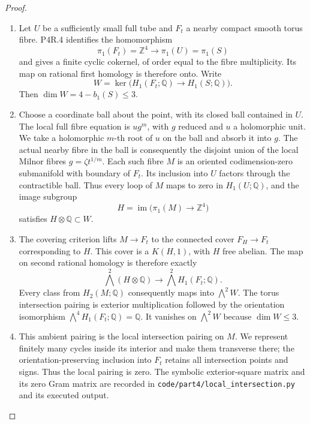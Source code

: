 \begin{proof}

\begin{enumerate}[label={$\langle1\rangle$\arabic*.},leftmargin=*]
\item Let $U$ be a sufficiently small full tube and $F_t$ a
nearby compact smooth torus fibre. P4R.4 identifies the
homomorphism
\[
 \pi_1(F_t)=\mathbb Z^4\longrightarrow
 \pi_1(U)=\pi_1(S)
\]
and gives a finite cyclic cokernel, of order equal to
the fibre multiplicity. Its map on rational first
homology is therefore onto. Write
\[
 W=\ker\bigl(H_1(F_t;\mathbb Q)\longrightarrow
                  H_1(S;\mathbb Q)\bigr).
\]
Then $\dim W=4-b_1(S)\le3$.

\item Choose a coordinate ball about the point, with its
closed ball contained in $U$. The local full fibre
equation is $u g^m$, with $g$ reduced and $u$ a
holomorphic unit. We take a holomorphic $m$-th root of
$u$ on the ball and absorb it into $g$. The actual
nearby fibre in the ball is consequently the disjoint
union of the local Milnor fibres
$g=\zeta t^{1/m}$. Each such fibre $M$ is an oriented
codimension-zero submanifold with boundary of $F_t$.
Its inclusion into $U$ factors through the contractible
ball. Thus every loop of $M$ maps to zero in
$H_1(U;\mathbb Q)$, and the image subgroup
\[
 H=\operatorname{im}\bigl(\pi_1(M)\longrightarrow
                                 \mathbb Z^4\bigr)
\]
satisfies $H\otimes\mathbb Q\subset W$.

\item The covering criterion lifts $M\to F_t$ to the
connected cover $F_H\to F_t$ corresponding to $H$.
This cover is a $K(H,1)$, with $H$ free abelian. The
map on second rational homology is therefore exactly
\[
 \bigwedge^2(H\otimes\mathbb Q)\longrightarrow
              \bigwedge^2 H_1(F_t;\mathbb Q).
\]
Every class from $H_2(M;\mathbb Q)$ consequently maps
into $\bigwedge^2W$. The torus intersection pairing is
exterior multiplication followed by the orientation
isomorphism $\bigwedge^4H_1(F_t;\mathbb Q)=\mathbb Q$.
It vanishes on $\bigwedge^2W$ because $\dim W\le3$.

\item This ambient pairing is the local intersection
pairing on $M$. We represent finitely many cycles
inside its interior and make them transverse there;
the orientation-preserving inclusion into $F_t$
retains all intersection points and signs. Thus the
local pairing is zero. The symbolic exterior-square
matrix and its zero Gram matrix are recorded in
\texttt{code/part4/local\_intersection.py} and its
executed output.

\end{enumerate}
\end{proof}
